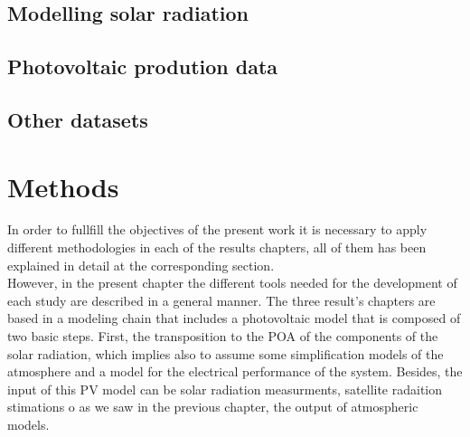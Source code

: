 \section{Modelling solar radiation}
\section{Photovoltaic prodution data}
\section{Other datasets}

\chapter{Methods\label{cha:methods}}

In order to fullfill the objectives of the present work it is necessary to apply different methodologies in each of the results chapters, all of them has been explained in detail at the corresponding section.\\ %

However, in the present chapter the different tools needed for the development of each study are described in a general manner. The three result's chapters are based in a modeling chain that includes a photovoltaic model that is composed of two basic steps. First, the transposition to the POA of the components of the solar radiation, which implies also to assume some simplification models of the atmosphere and a model for the electrical performance of the system. Besides, the input of this PV model can be solar radiation measurments, satellite radaition stimations o as we saw in the previous chapter, the output of atmospheric models. \\


